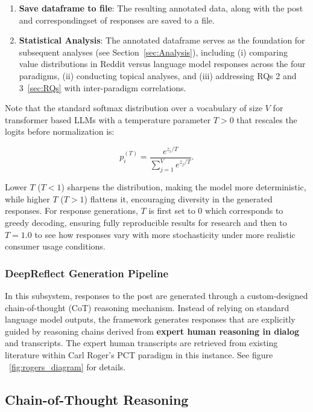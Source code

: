 \begin{enumerate}
    \item \textbf{Save dataframe to file}: The resulting annotated data, along with the post and correspondingset of responses are saved to a file.

    \item \textbf{Statistical Analysis}: The annotated dataframe serves as the foundation for subsequent analyses (see Section~\ref{sec:Analysis}), including (i) comparing value distributions in Reddit versus language model responses across the four paradigms, (ii) conducting topical analyses, and (iii) addressing RQs 2 and 3~\ref{sec:RQs} with inter-paradigm correlations.
\end{enumerate}

Note that the standard softmax distribution over a vocabulary of size $V$ for transformer based LLMs with a temperature parameter $T > 0$ that rescales the logits before normalization is: 

\begin{equation}
p_i^{(T)} = \frac{e^{z_i / T}}{\sum_{j=1}^{V} e^{z_j / T}}.
\label{eq:temp-softmax}
\end{equation}

Lower $T$ ($T<1$) sharpens the distribution, making the model more deterministic, while higher $T$ ($T>1$) flattens it, encouraging diversity in the generated responses. For response generations, $T$ is first set to 0 which corresponds to greedy decoding, ensuring fully reproducible results for research and then to $T = 1.0$ to see how responses vary with more stochasticity under more realistic consumer usage conditions.

\subsubsection{DeepReflect Generation Pipeline}
In this subsystem, responses to the post are generated through a custom-designed chain-of-thought (CoT) reasoning mechanism. Instead of relying on standard language model outputs, the framework generates responses that are explicitly guided by reasoning chains derived from \textbf{expert human reasoning in dialog} and transcripts. The expert human transcripts are retrieved from existing literature within Carl Roger's PCT paradigm \cite{rogersgloria} in this instance. See figure ~\ref{fig:rogers_diagram} for details.

\subsection*{Chain-of-Thought Reasoning}


